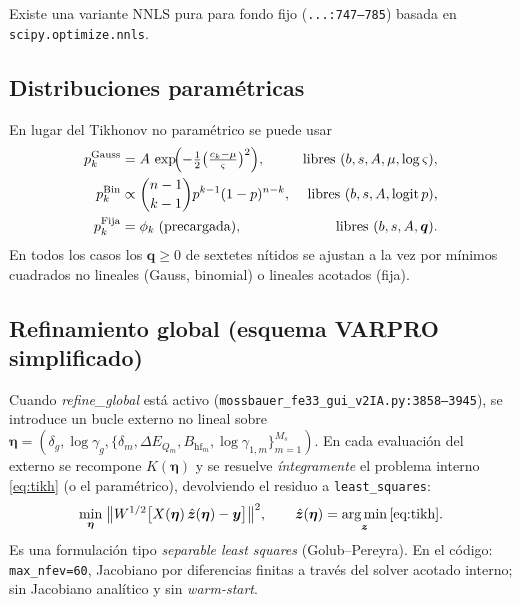 \documentclass[11pt,a4paper]{article}
\newcommand{\BHF}{B_{\mathrm{hf}}}
\newcommand{\dEQ}{\Delta E_{Q}}
\newcommand{\code}[1]{\texttt{\small #1}}
\newcommand{\file}[1]{\textcolor{black!70}{\texttt{\small #1}}}
\DeclareMathOperator*{\argmin}{arg\,min}
\begin{document}
Existe una variante NNLS pura para fondo fijo (\file{...:747--785}) basada en \code{scipy.optimize.nnls}.

\subsection{Distribuciones paramétricas}\label{sec:param}
En lugar del Tikhonov no paramétrico se puede usar
\begin{align}
  p_k^{\text{Gauss}} &= A\,\exp\!\Bigl(-\tfrac12 \bigl(\tfrac{c_k-\mu}{\varsigma}\bigr)^{2}\Bigr), & \text{libres } (b,s,A,\mu,\log\varsigma),\\
  p_k^{\text{Bin}} &\propto \binom{n-1}{k-1} p^{k-1}(1-p)^{n-k},& \text{libres } (b,s,A,\text{logit}\,p),\\
  p_k^{\text{Fija}} &= \phi_k\;\text{(precargada)},& \text{libres } (b,s,A,\bm q).
\end{align}
En todos los casos los $\bm q\ge0$ de sextetes nítidos se ajustan a la vez por mínimos cuadrados no lineales (Gauss, binomial) o lineales acotados (fija).

\subsection{Refinamiento global (esquema VARPRO simplificado)}
Cuando \emph{refine\_global} está activo (\file{mossbauer\_fe33\_gui\_v2IA.py:3858--3945}), se introduce un bucle externo no lineal sobre $\bm\eta=(\delta_g,\log\gamma_g,\{\delta_m,\dEQ_m,\BHF_m,\log\gamma_{1,m}\}_{m=1}^{M_s})$. En cada evaluación del externo se recompone $K(\bm\eta)$ y se resuelve \emph{íntegramente} el problema interno \eqref{eq:tikh} (o el paramétrico), devolviendo el residuo a \code{least\_squares}:
\begin{equation}
  \min_{\bm\eta}\;\bigl\|W^{1/2}\bigl[X(\bm\eta)\,\hat{\bm z}(\bm\eta) - \bm y\bigr]\bigr\|^{2},
  \qquad
  \hat{\bm z}(\bm\eta)=\argmin_{\bm z}\eqref{eq:tikh}.
  \label{eq:varpro}
\end{equation}
Es una formulación tipo \emph{separable least squares} (Golub--Pereyra). En el código: \code{max\_nfev=60}, Jacobiano por diferencias finitas a través del solver acotado interno; sin Jacobiano analítico y sin \emph{warm-start}.
\end{document}
